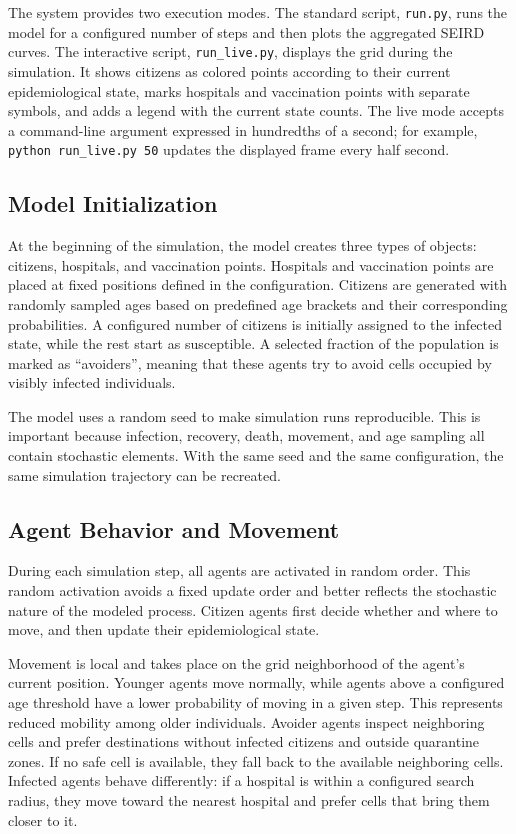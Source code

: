 \documentclass[english]{projectreport}
\begin{document}
The system provides two execution modes. The standard script,
\texttt{run.py}, runs the model for a configured number of steps and then
plots the aggregated SEIRD curves. The interactive script,
\texttt{run\_live.py}, displays the grid during the simulation. It shows
citizens as colored points according to their current epidemiological
state, marks hospitals and vaccination points with separate symbols, and
adds a legend with the current state counts. The live mode accepts a
command-line argument expressed in hundredths of a second; for example,
\texttt{python run\_live.py 50} updates the displayed frame every half
second.

\subsection{Model Initialization}
\label{sec:solution-initialization}

At the beginning of the simulation, the model creates three types of
objects: citizens, hospitals, and vaccination points. Hospitals and
vaccination points are placed at fixed positions defined in the
configuration. Citizens are generated with randomly sampled ages based on
predefined age brackets and their corresponding probabilities. A
configured number of citizens is initially assigned to the infected
state, while the rest start as susceptible. A selected fraction of the
population is marked as ``avoiders'', meaning that these agents try to
avoid cells occupied by visibly infected individuals.

The model uses a random seed to make simulation runs reproducible. This
is important because infection, recovery, death, movement, and age
sampling all contain stochastic elements. With the same seed and the same
configuration, the same simulation trajectory can be recreated.

\subsection{Agent Behavior and Movement}
\label{sec:solution-agent-behavior}

During each simulation step, all agents are activated in random order.
This random activation avoids a fixed update order and better reflects
the stochastic nature of the modeled process. Citizen agents first decide
whether and where to move, and then update their epidemiological state.

Movement is local and takes place on the grid neighborhood of the
agent's current position. Younger agents move normally, while agents
above a configured age threshold have a lower probability of moving in a
given step. This represents reduced mobility among older individuals.
Avoider agents inspect neighboring cells and prefer destinations without
infected citizens and outside quarantine zones. If no safe cell is
available, they fall back to the available neighboring cells. Infected
agents behave differently: if a hospital is within a configured search
radius, they move toward the nearest hospital and prefer cells that bring
them closer to it.
\end{document}
